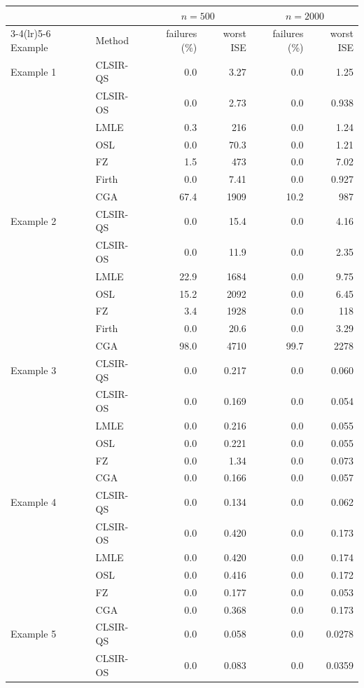 \begin{tabular}{llrrrr}
\toprule
& & \multicolumn{2}{c}{$n=500$} & \multicolumn{2}{c}{$n=2000$}\\
\cmidrule(lr){3-4}\cmidrule(lr){5-6}
Example & Method & failures (\%) & worst ISE & failures (\%) & worst ISE\\
\midrule
Example 1 & CLSIR-QS & 0.0 & 3.27 & 0.0 & 1.25\\
 & CLSIR-OS & 0.0 & 2.73 & 0.0 & 0.938\\
 & LMLE & 0.3 & 216 & 0.0 & 1.24\\
 & OSL & 0.0 & 70.3 & 0.0 & 1.21\\
 & FZ & 1.5 & 473 & 0.0 & 7.02\\
 & Firth & 0.0 & 7.41 & 0.0 & 0.927\\
 & CGA & 67.4 & 1909 & 10.2 & 987\\
\addlinespace
Example 2 & CLSIR-QS & 0.0 & 15.4 & 0.0 & 4.16\\
 & CLSIR-OS & 0.0 & 11.9 & 0.0 & 2.35\\
 & LMLE & 22.9 & 1684 & 0.0 & 9.75\\
 & OSL & 15.2 & 2092 & 0.0 & 6.45\\
 & FZ & 3.4 & 1928 & 0.0 & 118\\
 & Firth & 0.0 & 20.6 & 0.0 & 3.29\\
 & CGA & 98.0 & 4710 & 99.7 & 2278\\
\addlinespace
Example 3 & CLSIR-QS & 0.0 & 0.217 & 0.0 & 0.060\\
 & CLSIR-OS & 0.0 & 0.169 & 0.0 & 0.054\\
 & LMLE & 0.0 & 0.216 & 0.0 & 0.055\\
 & OSL & 0.0 & 0.221 & 0.0 & 0.055\\
 & FZ & 0.0 & 1.34 & 0.0 & 0.073\\
 & CGA & 0.0 & 0.166 & 0.0 & 0.057\\
\addlinespace
Example 4 & CLSIR-QS & 0.0 & 0.134 & 0.0 & 0.062\\
 & CLSIR-OS & 0.0 & 0.420 & 0.0 & 0.173\\
 & LMLE & 0.0 & 0.420 & 0.0 & 0.174\\
 & OSL & 0.0 & 0.416 & 0.0 & 0.172\\
 & FZ & 0.0 & 0.177 & 0.0 & 0.053\\
 & CGA & 0.0 & 0.368 & 0.0 & 0.173\\
\addlinespace
Example 5 & CLSIR-QS & 0.0 & 0.058 & 0.0 & 0.0278\\
 & CLSIR-OS & 0.0 & 0.083 & 0.0 & 0.0359\\

\end{tabular}
